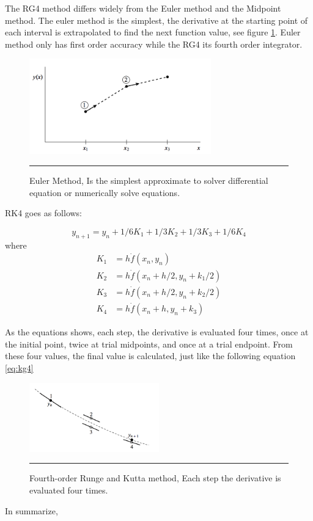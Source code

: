The RG4 method differs widely from the Euler method and the Midpoint method. The euler method is the simplest, the derivative at the starting point of each interval is extrapolated to find the next function value, see figure \ref{fig:euler}. Euler method only has first order accuracy while the RG4 its fourth order integrator.

\begin{figure}[htbp]
	\centering
		\includegraphics[width=0.7\textwidth]{Figures/euler.png}
		\rule{35em}{0.5pt}
	\caption[Euler Method]{Euler Method, Is the simplest approximate to solver differential equation or numerically solve equations.}
	\label{fig:euler}
\end{figure}

RK4 goes as follows:

\begin{equation} \label{eq:rk4}
y_{n+1} = y_{n} + 1/6 K_{1} + 1/3 K_{2} +1/3 K_{3} + 1/6 K_{4}
\end{equation}
where
\begin{equation}
\begin{split} \label{eq:rksplit}
K_{1} &= h \dot f(x_{n}, y_{n}) \\
K_{2} &= h \dot f(x_{n} + h/2, y_{n} + k_{1}/2) \\
K_{3} &= h \dot f(x_{n} + h/2, y_{n} + k_{2}/2) \\
K_{4} &= h \dot f(x_{n} + h, y_{n} + k_{3})
\end{split}
\end{equation}

As the equations shows, each step, the derivative is evaluated four times, once at the initial point, twice at trial midpoints, and once at a trial endpoint. From these four values, the final value is calculated, just like the following equation \ref{eq:kg4}

\begin{figure}[htbp]
	\centering
		\includegraphics[width=0.5\textwidth]{Figures/rk4.png}
		\rule{35em}{0.5pt}
	\caption[Fourth-order Runge and Kutta Method]{Fourth-order Runge and Kutta method, Each step the derivative is evaluated four times. }
	\label{fig:kutta}
\end{figure}

\cite{numerical}


\vspace{3.2em}


In summarize, 
